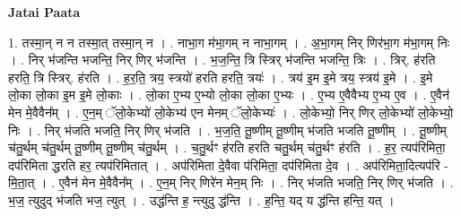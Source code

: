 \documentclass[17pt]{extarticle}
\begin{document}
\textbf{Jatai Paata} \newline

1. तस्मा॒न् न न तस्मा॒त् तस्मा॒न् न । . नाभा॒ग म॑भा॒गम् न नाभा॒गम् । . अ॒भा॒गम् निर् णिर॑भा॒ग म॑भा॒गम् निः । . निर् भ॑जन्ति भजन्ति॒ निर् णिर् भ॑जन्ति । . भ॒ज॒न्ति॒ त्रि स्त्रिर् भ॑जन्ति भजन्ति॒ त्रिः । . त्रिर्. ह॑रति हरति॒ त्रि स्त्रिर्. ह॑रति । . ह॒र॒ति॒ त्रय॒ स्त्रयो॑ हरति हरति॒ त्रयः॑ । . त्रय॑ इ॒म इ॒मे त्रय॒ स्त्रय॑ इ॒मे । . इ॒मे लो॒का लो॒का इ॒म इ॒मे लो॒काः । . लो॒का ए॒भ्य ए॒भ्यो लो॒का लो॒का ए॒भ्यः । . ए॒भ्य ए॒वैवैभ्य ए॒भ्य ए॒व । . ए॒वैन॑ मेन मे॒वैवैन᳚म् । . ए॒न॒म् ॅलो॒केभ्यो॑ लो॒केभ्य॑ एन मेनम् ॅलो॒केभ्यः॑ । . लो॒केभ्यो॒ निर् णिर् लो॒केभ्यो॑ लो॒केभ्यो॒ निः । . निर् भ॑जति भजति॒ निर् णिर् भ॑जति । . भ॒ज॒ति॒ तू॒ष्णीम् तू॒ष्णीम् भ॑जति भजति तू॒ष्णीम् । . तू॒ष्णीम् च॑तु॒र्थम् च॑तु॒र्थम् तू॒ष्णीम् तू॒ष्णीम् च॑तु॒र्थम् । . च॒तु॒र्थꣳ ह॑रति हरति चतु॒र्थम् च॑तु॒र्थꣳ ह॑रति । . ह॒र॒ त्यप॑रिमिता॒ दप॑रिमिता द्धरति हर॒ त्यप॑रिमितात् । . अप॑रिमिता दे॒वैवा प॑रिमिता॒ दप॑रिमिता दे॒व । . अप॑रिमिता॒दित्यप॑रि - मि॒ता॒त् । . ए॒वैन॑ मेन मे॒वैवैन᳚म् । . ए॒न॒म् निर् णिरे॑न मेन॒म् निः । . निर् भ॑जति भजति॒ निर् णिर् भ॑जति । . भ॒ज॒ त्युदुद् भ॑जति भज॒ त्युत् । . उद्ध॑न्ति ह॒ न्त्युदु द्ध॑न्ति । . ह॒न्ति॒ यद् य द्ध॑न्ति हन्ति॒ यत् । \newline
\end{document}
